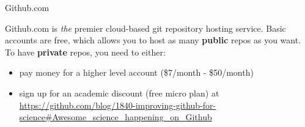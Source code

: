 \documentclass{beamer}
\begin{document}
\begin{frame}{Github.com}

  Github.com is \textit{the} premier cloud-based git repository hosting
  service. Basic accounts are free, which allows you to host as many
  \textbf{public} repos as you want. To have \textbf{private} repos,
  you need to either:
  \begin{itemize}
  \item pay money for a higher level account (\$7/month - \$50/month)
  \item sign up for an academic discount (free micro plan) at  \url{https://github.com/blog/1840-improving-github-for-science\#Awesome_science_happening_on_Github}
  \end{itemize}


\end{frame}
\end{document}
